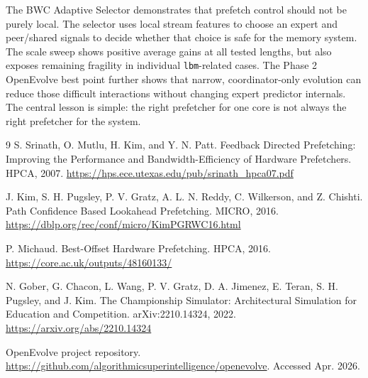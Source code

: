 \documentclass[10pt,letterpaper]{article}
\newcommand{\code}[1]{\texttt{#1}}
\begin{document}
The BWC Adaptive Selector demonstrates that prefetch control should not be
purely local. The selector uses local stream features to choose an expert and
peer/shared signals to decide whether that choice is safe for the memory
system. The scale sweep shows positive average gains at all tested lengths, but
also exposes remaining fragility in individual \code{lbm}-related cases. The
Phase 2 OpenEvolve best point further shows that narrow, coordinator-only
evolution can reduce those difficult interactions without changing expert
predictor internals. The central lesson is simple: the right prefetcher for one
core is not always the right prefetcher for the system.

\enlargethispage{3\baselineskip}
\small
\begin{thebibliography}{9}
S. Srinath, O. Mutlu, H. Kim, and Y. N. Patt. Feedback Directed Prefetching:
Improving the Performance and Bandwidth-Efficiency of Hardware Prefetchers.
HPCA, 2007. \url{https://hps.ece.utexas.edu/pub/srinath_hpca07.pdf}

J. Kim, S. H. Pugsley, P. V. Gratz, A. L. N. Reddy, C. Wilkerson, and
Z. Chishti. Path Confidence Based Lookahead Prefetching. MICRO, 2016.
\url{https://dblp.org/rec/conf/micro/KimPGRWC16.html}

P. Michaud. Best-Offset Hardware Prefetching. HPCA, 2016.
\url{https://core.ac.uk/outputs/48160133/}

N. Gober, G. Chacon, L. Wang, P. V. Gratz, D. A. Jimenez, E. Teran,
S. H. Pugsley, and J. Kim. The Championship Simulator: Architectural Simulation
for Education and Competition. arXiv:2210.14324, 2022.
\url{https://arxiv.org/abs/2210.14324}

OpenEvolve project repository.
\url{https://github.com/algorithmicsuperintelligence/openevolve}. Accessed Apr. 2026.
\end{thebibliography}
\end{document}
